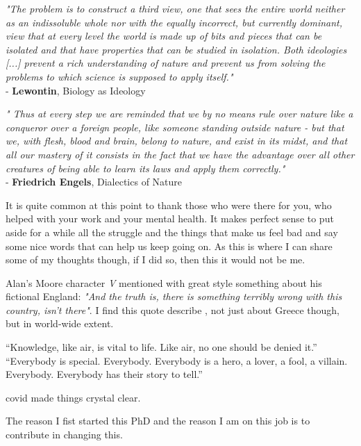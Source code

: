 \documentclass[master=elt, cleveref, autoref, masteroption=eg]{kulemt}
\begin{document}
 


\begin{preface}
  
   \textit{
      "The problem is to construct a third view, one that sees the entire world 
      neither as an indissoluble whole nor with the equally incorrect, but currently dominant, 
      view that at every level the world is made up of bits and pieces that can be isolated 
      and that have properties that can be studied in isolation. 
      Both ideologies [...] prevent a rich understanding of nature and prevent us from solving 
      the problems to which science is supposed to apply itself." \\
      }
   - \textbf{Lewontin}, Biology as Ideology

   \textit{
      "
      Thus at every step we are reminded that we by no means rule over nature like a conqueror over a foreign people, 
      like someone standing outside nature - but that we, with flesh, blood and brain, belong to nature, 
      and exist in its midst, and that all our mastery of it consists in the fact that we have the advantage over 
      all other creatures of being able to learn its laws and apply them correctly." \\
      }
   - \textbf{Friedrich Engels}, Dialectics of Nature


   It is quite common at this point to thank those who were there for you, 
   who helped with your work and your mental health. 
   It makes perfect sense to put aside for a while all the struggle and the 
   things that make us feel bad and say some nice words that can help us keep going on. 
   As this is where I can share some of my thoughts though, 
   if I did so, then this it would not be me. 
   
   Alan's Moore character \textit{V} mentioned with great style something about 
   his fictional England:   
   \textit{"And the truth is, there is something terribly wrong with this country, isn't there"}.
   I find this quote  describe , not just about Greece though, but in world-wide extent. 


   “Knowledge, like air, is vital to life. Like air, no one should be denied it.”
   “Everybody is special. Everybody. Everybody is a hero, a lover, a fool, a villain. Everybody. Everybody has their story to tell.”


   covid made things crystal clear. 


   The reason I fist started this PhD and the reason I am on this job is to contribute in changing this. 



\end{preface}
\end{document}
